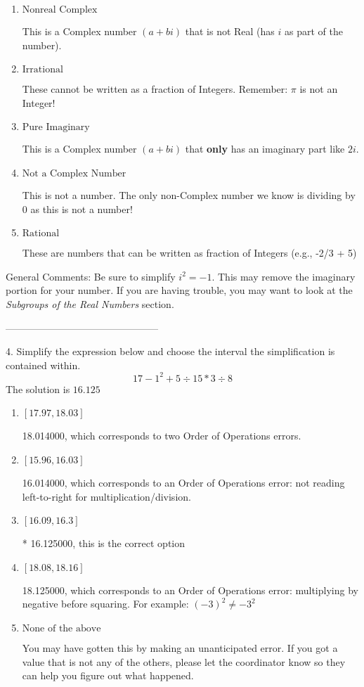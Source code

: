 \documentclass{extbook}[14pt]
\begin{document}
\begin{enumerate}[label=\Alph*.] 
\item $ \text{Nonreal Complex} $ 

 This is a Complex number $(a+bi)$ that is not Real (has $i$ as part of the number). 
\item $ \text{Irrational} $ 

 These cannot be written as a fraction of Integers. Remember: $\pi$ is not an Integer! 
\item $ \text{Pure Imaginary} $ 

 This is a Complex number $(a+bi)$ that \textbf{only} has an imaginary part like $2i$. 
\item $ \text{Not a Complex Number} $ 

 This is not a number. The only non-Complex number we know is dividing by 0 as this is not a number! 
\item $ \text{Rational} $ 

 These are numbers that can be written as fraction of Integers (e.g., -2/3 + 5) 
\end{enumerate} 
 
General Comments: Be sure to simplify $i^2 = -1$. This may remove the imaginary portion for your number. If you are having trouble, you may want to look at the \textit{Subgroups of the Real Numbers} section.

-----------------------------------------------

4. Simplify the expression below and choose the interval the simplification is contained within.
\[ 17 - 1^2 + 5 \div 15 * 3 \div 8 \] 
The solution is $ 16.125 $ 

\begin{enumerate}[label=\Alph*.] 
\item $ [17.97, 18.03] $ 

  18.014000, which corresponds to two Order of Operations errors. 
\item $ [15.96, 16.03] $ 

  16.014000, which corresponds to an Order of Operations error: not reading left-to-right for multiplication/division. 
\item $ [16.09, 16.3] $ 

 * 16.125000, this is the correct option 
\item $ [18.08, 18.16] $ 

  18.125000, which corresponds to an Order of Operations error: multiplying by negative before squaring. For example: $(-3)^2 \neq -3^2$ 
\item $ \text{None of the above} $ 

  You may have gotten this by making an unanticipated error. If you got a value that is not any of the others, please let the coordinator know so they can help you figure out what happened. 
\end{enumerate} 
 
\end{document}
